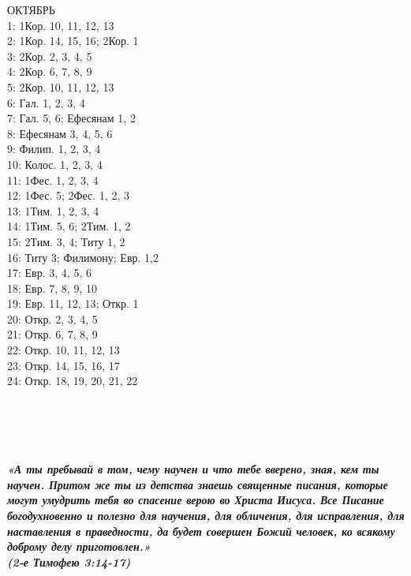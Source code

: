 \documentclass[fontsize=16pt,letterpaper,DIV=6]{scrartcl}
\begin{document}
\begin{multicols}{2}
ОКТЯБРЬ
\\  1: 1Кор. 10, 11, 12, 13
\\  2: 1Кор. 14, 15, 16; 2Кор. 1
\\  3: 2Кор. 2, 3, 4, 5
\\  4: 2Кор. 6, 7, 8, 9
\\  5: 2Кор. 10, 11, 12, 13
\\  6: Гал. 1, 2, 3, 4
\\  7: Гал. 5, 6; Ефесянам 1, 2
\\  8: Ефесянам 3, 4, 5, 6
\\  9: Филип. 1, 2, 3, 4
\\  10: Колос. 1, 2, 3, 4
\\  11: 1Фес. 1, 2, 3, 4
\\  12: 1Фес. 5; 2Фес. 1, 2, 3
\\  13: 1Тим. 1, 2, 3, 4
\\  14: 1Тим. 5, 6; 2Тим. 1, 2
\\  15: 2Тим. 3, 4; Титу 1, 2
\\  16: Титу 3; Филимону; Евр. 1,2
\\  17: Евр. 3, 4, 5, 6
\\  18: Евр. 7, 8, 9, 10
\\  19: Евр. 11, 12, 13; Откр. 1
\\  20: Откр. 2, 3, 4, 5
\\  21: Откр. 6, 7, 8, 9
\\  22: Откр. 10, 11, 12, 13
\\  23: Откр. 14, 15, 16, 17
\\  24: Откр. 18, 19, 20, 21, 22
\\
\\
\\
\\
\\
\end{multicols}
\clearpage

{\centering\Large\itshape\bfseries «А ты пребывай в том, чему научен и что тебе вверено, зная, кем ты научен.
Притом же ты из детства знаешь священные писания, которые могут умудрить тебя во спасение верою во Христа Иисуса. 
Все Писание богодухновенно и полезно для научения, для обличения, для исправления, для наставления в праведности, да будет совершен Божий человек, ко всякому доброму делу приготовлен.»\\

(2-е Тимофею 3:14-17)\par}
\end{document}
